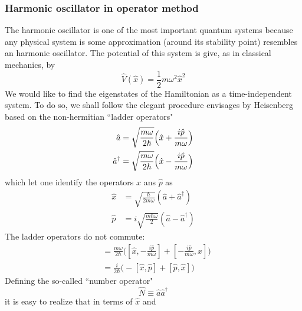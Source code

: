 \subsubsection{Harmonic oscillator in operator method}
The harmonic oscillator is one of the most important quantum
systems because any physical system is some approximation
(around its stability point) resembles an harmonic
oscillator. The potential of this system is give, as in
classical mechanics, by 
\begin{equation}
  \hat{V}(\hat{x}) = \frac{1}{2} m \omega^2 \hat{x}^2
  \label{equ:2.67}
\end{equation}
We would like to find the eigenstates of the Hamiltonian as
a time-independent system. To do so, we shall follow the
elegant procedure envisages by Heisenberg based on the
non-hermitian ``ladder operators"
\begin{subequations}
  \begin{align}
    \hat{a}&=\sqrt{\frac{m\omega}{2\hbar}}\Bigl(\hat{x}+\frac{i\hat{p}}{m\omega}\Bigr)\label{equ:2.68a}\\
    \hat{a}^{\dagger}&=\sqrt{\frac{m\omega}{2\hbar}}\Bigl(\hat{x}-\frac{i\hat{p}}{m\omega}\Bigr)\label{equ:2.68b}
  \end{align}
  \label{equ:2.68}
\end{subequations}
which let one identify the operators $\hat{x}$ ans $\hat{p}$
as
\begin{subequations}
  \begin{align}
    \hat{x} &=
    \sqrt{\frac{\hbar}{2m\omega}}(\hat{a}+\hat{a}^{\dagger})\label{equ:2.69a}\\
    \hat{p} &=
    i\sqrt{\frac{m\hbar \omega}{2}}(\hat{a}-\hat{a}^{\dagger})\label{equ:2.69b}
  \end{align}
\end{subequations}
The ladder operators do not commute:
\begin{align}
  [\hat{a}, \hat{a}^{\dagger}] &= \frac{m\omega}{2\hbar}
  \biggl([\hat{x},-\frac{i\hat{p}}{m\omega}]+[-\frac{i\hat{p}}{m\omega},\hat{x}]\biggr)
  \nonumber\\
  &= \frac{i}{2\hbar}\biggl(
  -[\hat{x},\hat{p}]+[\hat{p},\hat{x}]
  \biggr)\label{equ:2.70}
\end{align}
Defining the so-called ``number operator"
\begin{equation}
  \hat{N} \equiv \hat{a}\hat{a}^{\dagger}
  \label{equ:2.71}
\end{equation}
it is easy to realize that in terms of $\hat{x}$ and
